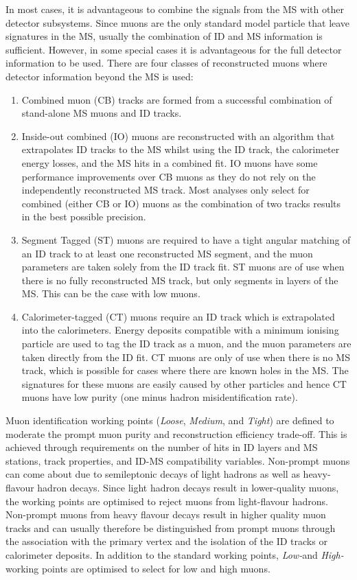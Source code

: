 In most cases, it is advantageous to combine the signals from the MS with other detector subsystems. Since muons are the only standard model particle that leave signatures in the MS, usually the combination of ID and MS information is sufficient. However, in some special cases it is advantageous for the full detector information to be used. There are four classes of reconstructed muons where detector information beyond the MS is used:
\begin{enumerate}
    \item Combined muon (CB) tracks are formed from a successful combination of stand-alone MS muons and ID tracks.
    \item Inside-out combined (IO) muons are reconstructed with an algorithm that extrapolates ID tracks to the MS whilst using the ID track, the calorimeter energy losses, and the MS hits in a combined fit. IO muons have some performance improvements over CB muons as they do not rely on the independently reconstructed MS track. Most analyses only select for combined (either CB or IO) muons as the combination of two tracks results in the best possible precision.
    \item Segment Tagged (ST) muons are required to have a tight angular matching of an ID track to at least one reconstructed MS segment, and the muon parameters are taken solely from the ID track fit. ST muons are of use when there is no fully reconstructed MS track, but only segments in layers of the MS. This can be the case with low \pt muons.
    \item Calorimeter-tagged (CT) muons require an ID track which is extrapolated into the calorimeters. Energy deposits compatible with a minimum ionising particle are used to tag the ID track as a muon, and the muon parameters are taken directly from the ID fit. CT muons are only of use when there is no MS track, which is possible for cases where there are known holes in the MS. The signatures for these muons are easily caused by other particles and hence CT muons have low purity (one minus hadron misidentification rate).
\end{enumerate}
Muon identification working points (\textit{Loose}, \textit{Medium}, and \textit{Tight}) are defined to moderate the prompt muon purity and reconstruction efficiency trade-off. This is achieved through requirements on the number of hits in ID layers and MS stations, track properties, and ID-MS compatibility variables. Non-prompt muons can come about due to semileptonic decays of light hadrons as well as heavy-flavour hadron decays. Since light hadron decays result in lower-quality muons, the working points are optimised to reject muons from light-flavour hadrons. Non-prompt muons from heavy flavour decays result in higher quality muon tracks and can usually therefore be distinguished from prompt muons through the association with the primary vertex and the isolation of the ID tracks or calorimeter deposits. In addition to the standard working points, \textit{Low-}\pt and \textit{High-}\pt working points are optimised to select for low and high \pt muons.


